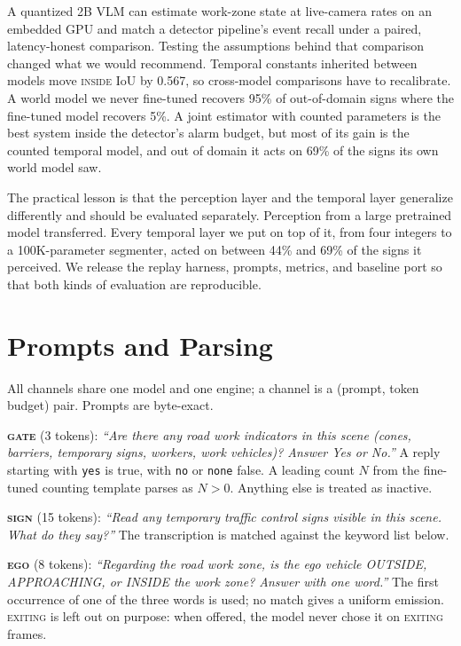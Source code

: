 \documentclass[journal]{IEEEtran}
\newcommand{\st}[1]{\textsc{#1}}
\begin{document}
A quantized 2B VLM can estimate work-zone state at live-camera rates on an embedded GPU and match a detector pipeline's event recall under a paired, latency-honest comparison.  Testing the assumptions behind that comparison changed what we would recommend.  Temporal constants inherited between models move \st{inside} IoU by 0.567, so cross-model comparisons have to recalibrate. A world model we never fine-tuned recovers 95\% of out-of-domain signs where the fine-tuned model recovers 5\%.  A joint estimator with counted parameters is the best system inside the detector's alarm budget, but most of its gain is the counted temporal model, and out of domain it acts on 69\% of the signs its own world model saw.

The practical lesson is that the perception layer and the temporal layer generalize differently and should be evaluated separately.  Perception from a large pretrained model transferred.  Every temporal layer we put on top of it, from four integers to a 100K-parameter segmenter, acted on between 44\% and 69\% of the signs it perceived.  We release the replay harness, prompts, metrics, and baseline port so that both kinds of evaluation are reproducible.

\appendices

\section{Prompts and Parsing}
\label{app:prompts}

All channels share one model and one engine; a channel is a (prompt, token budget) pair.  Prompts are byte-exact.

\textbf{\st{gate}} (3 tokens): \emph{``Are there any road work indicators in this scene (cones, barriers, temporary signs, workers, work vehicles)? Answer Yes or No.''}  A reply starting with \texttt{yes} is true, with \texttt{no} or \texttt{none} false.  A leading count $N$ from the fine-tuned counting template parses as $N>0$.  Anything else is treated as inactive.

\textbf{\st{sign}} (15 tokens): \emph{``Read any temporary traffic control signs visible in this scene. What do they say?''}  The transcription is matched against the keyword list below.

\textbf{\st{ego}} (8 tokens): \emph{``Regarding the road work zone, is the ego vehicle OUTSIDE, APPROACHING, or INSIDE the work zone? Answer with one word.''} The first occurrence of one of the three words is used; no match gives a uniform emission.  \st{exiting} is left out on purpose: when offered, the model never chose it on \st{exiting} frames.
\end{document}
